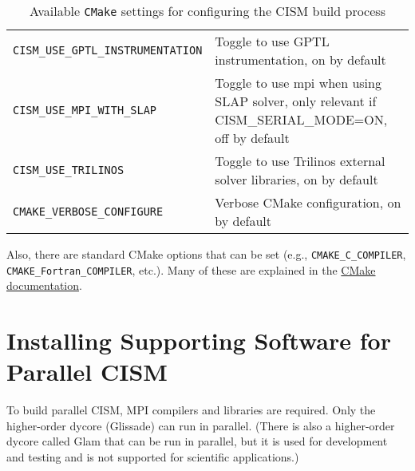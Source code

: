 \begin{table}
\begin{tabular}{ l | p{8cm} }
\texttt{CISM\_USE\_GPTL\_INSTRUMENTATION} & Toggle to use GPTL instrumentation, on by default \\

\texttt{CISM\_USE\_MPI\_WITH\_SLAP} & Toggle to use mpi when using SLAP solver, only relevant if CISM\_SERIAL\_MODE=ON, off by default \\

\texttt{CISM\_USE\_TRILINOS} & Toggle to use Trilinos external solver libraries, on by default \\

\texttt{CMAKE\_VERBOSE\_CONFIGURE} & Verbose CMake configuration, on by default \\







\hline
\end{tabular}
  \caption{Available \texttt{CMake} settings for configuring the CISM build process}
  \label{cmake-options}
\end{table}

Also, there are standard CMake options that can be set (e.g., \texttt{CMAKE\_C\_COMPILER}, \texttt{CMAKE\_Fortran\_COMPILER}, etc.).  Many of these are explained in the \href{http://www.cmake.org/Wiki/CMake_Useful_Variables}{CMake documentation}.



\section{Installing Supporting Software for Parallel CISM}
To build parallel CISM, MPI compilers and libraries are required.  
Only the higher-order dycore (Glissade) can run in parallel.  (There is also a
higher-order dycore called Glam that can be run in parallel, but it is used
for development and testing and is not supported for scientific applications.)


